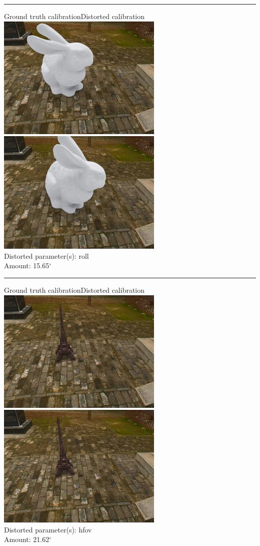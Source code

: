 \begin{minipage}{\linewidth}
\centering
\hrule\vspace{1em}
Ground truth calibration\hspace{0.2\linewidth}Distorted calibration\\\vspace{0.5em}
\includegraphics[width=0.45\linewidth]{study/thumb/pano_ahxnzyleoiflya-0_5_gt.jpg}
\includegraphics[width=0.45\linewidth]{study/thumb/pano_ahxnzyleoiflya-0_5_dc.jpg}\\
Distorted parameter(s): roll\\
Amount: 15.65$^\circ$
\end{minipage}

\begin{minipage}{\linewidth}
\centering
\hrule\vspace{1em}
Ground truth calibration\hspace{0.2\linewidth}Distorted calibration\\\vspace{0.5em}
\includegraphics[width=0.45\linewidth]{study/thumb/pano_ahxnzyleoiflya-0_6_gt.jpg}
\includegraphics[width=0.45\linewidth]{study/thumb/pano_ahxnzyleoiflya-0_6_dc.jpg}\\
Distorted parameter(s): hfov\\
Amount: 21.62$^\circ$
\end{minipage}


